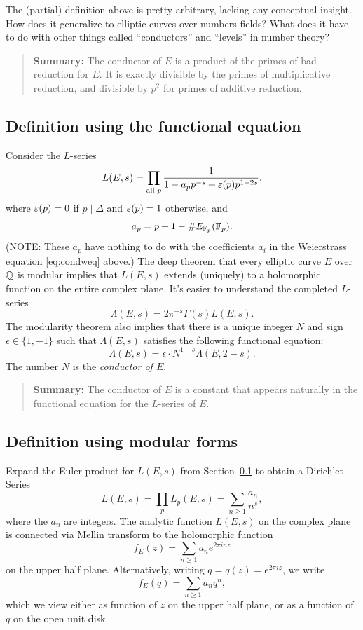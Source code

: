\documentclass{book}
\begin{document}
The (partial) definition above is pretty arbitrary, lacking any
conceptual insight.   How does it generalize to elliptic curves
over numbers fields?  What does it have to do
with other things called ``conductors'' and ``levels''
in number theory?


\begin{quote}
{\bf Summary:} The conductor of $E$ is a product of the primes of bad
reduction for $E$.  It is exactly divisible by the primes of multiplicative
reduction, and divisible by $p^2$ for primes of additive reduction.
\end{quote}

\subsection{Definition using the functional equation}\label{sec:condfe}
Consider the $L$-series
$$
L(E,s) = \prod_{\text{all }p} \frac{1}{1-a_p p^{-s} + \varepsilon(p)p^{1-2s}},
$$
where $\varepsilon(p)=0$ if $p\mid \Delta$ and $\varepsilon(p)=1$ otherwise, and
$$
 a_p = p + 1 - \# E_{\mathbb{F}_p}(\mathbb{F}_p).
$$
(NOTE: These $a_p$ have nothing to do with the coefficients
$a_i$ in the Weierstrass equation \eqref{eq:condweq} above.)
The deep theorem that every elliptic curve $E$ over $\mathbb{Q}$ is modular
implies that $L(E,s)$ extends (uniquely) to a holomorphic function
on the entire complex plane.  It's easier to understand the completed
$L$-series
$$
\Lambda(E,s) = 2\pi^{-s}\Gamma(s) L(E,s).
$$
The modularity theorem also implies that there is a unique integer
$N$ and sign $\epsilon\in \{1,-1\}$ such that $\Lambda(E,s)$ satisfies the following functional equation:
$$
\Lambda(E,s) = \epsilon \cdot N^{1-s} \Lambda(E,2-s).
$$
The number $N$ is the {\em conductor of $E$}.



\begin{quote}
{\bf Summary:} The conductor of $E$ is a constant that appears
naturally in the functional equation for the $L$-series of $E$.
\end{quote}

\subsection{Definition using modular forms}\label{sec:condmodform}
Expand the Euler product for
$L(E,s)$ from Section~\ref{sec:condfe}
to obtain a Dirichlet Series
$$
L(E,s) = \prod_{p} L_p(E,s) = \sum_{n\geq 1} \frac{a_n}{n^s},
$$
where the $a_n$ are integers.
The analytic function $L(E,s)$ on the complex plane is connected
via Mellin transform to the holomorphic function
$$
f_E(z) = \sum_{n\geq 1} a_n e^{2\pi i n z}
$$
on the upper half plane.  Alternatively, writing $q=q(z) = e^{2\pi i z}$,
we write
$$
f_E(q) = \sum_{n\geq 1} a_n q^n,
$$
which we view either as function of $z$ on the upper half plane,
or as a function of $q$ on the open unit disk.
\end{document}
